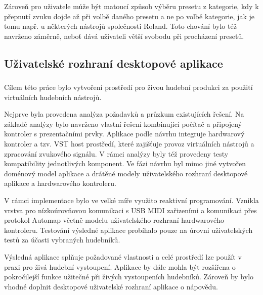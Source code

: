 \documentclass[thesis=M,czech]{FITthesis}[2019/03/06]
\begin{document}
				Zároveň pro uživatele může být matoucí způsob výběru presetu z kategorie, kdy k přepnutí zvuku dojde až při volbě daného presetu a ne po volbě kategorie, jak je tomu např. u některých nástrojů společnosti Roland. Toto chování bylo též navrženo záměrně, neboť dává uživateli větší svobodu při procházení presetů.
			
		\subsection{Uživatelské rozhraní desktopové aplikace}
			\subsubsection{}
\begin{conclusion}
	Cílem této práce bylo vytvoření prostředí pro živou hudební produkci za použití virtuálních hudebních nástrojů.
	
	Nejprve byla provedena analýza požadavků a průzkum existujících řešení. Na základě analýzy bylo navrženo
	vlastní řešení kombinující počítač a připojený kontroler s prezentačními prvky. Aplikace podle návrhu integruje hardwarový kontroler a tzv. VST host prostředí, které zajišťuje provoz virtuálních nástrojů a zpracování zvukového signálu. V rámci analýzy byly též provedeny testy kompatibility jednotlivých komponent. Ve fázi návrhu byl mimo jiné vytvořen doménový model aplikace a drátěné modely uživatelského rozhraní desktopové aplikace a hardwarového kontroleru.
	
	V rámci implementace bylo ve velké míře využito reaktivní programování. Vznikla vrstva pro nízkoúrovňovou komunikaci s USB MIDI zařizeními a komunikaci přes protokol Automap včetně modelu uživatelského rozhraní hardwarového kontroleru.
	Testování výsledné aplikace probíhalo pouze na úrovni uživatelských testů za účasti vybraných hudebníků.
	
	Výsledná aplikace splňuje požadované vlastnosti a celé prostředí lze použít v praxi pro živá hudební vystoupení. Aplikace by dále mohla být rozšířena o pokročilejší funkce užitečné při živých vystoupeních hudebníků. Zároveň by bylo vhodné doplnit desktopové uživatelské rozhraní aplikace o nápovědu.
	
	
\end{conclusion}




\appendix
\end{document}

